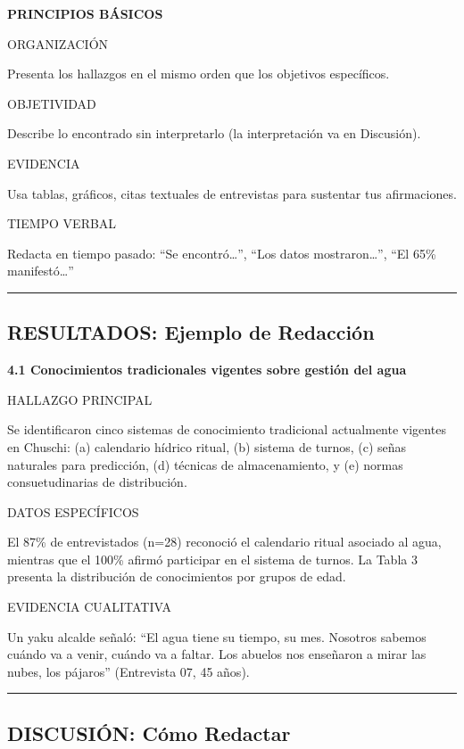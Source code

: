 \documentclass[
  11pt,
]{beaner}
\begin{document}
\textbf{PRINCIPIOS BÁSICOS}

{ORGANIZACIÓN}

Presenta los hallazgos en el mismo orden que los objetivos específicos.

{OBJETIVIDAD}

Describe lo encontrado sin interpretarlo (la interpretación va en
Discusión).

{EVIDENCIA}

Usa tablas, gráficos, citas textuales de entrevistas para sustentar tus
afirmaciones.

{TIEMPO VERBAL}

Redacta en tiempo pasado: ``Se encontró\ldots{}'', ``Los datos
mostraron\ldots{}'', ``El 65\% manifestó\ldots{}''

\begin{center}\rule{0.5\linewidth}{0.5pt}\end{center}

\subsection{RESULTADOS: Ejemplo de
Redacción}\label{resultados-ejemplo-de-redacciuxf3n}

\textbf{4.1 Conocimientos tradicionales vigentes sobre gestión del agua}

{HALLAZGO PRINCIPAL}

Se identificaron cinco sistemas de conocimiento tradicional actualmente
vigentes en Chuschi: (a) calendario hídrico ritual, (b) sistema de
turnos, (c) señas naturales para predicción, (d) técnicas de
almacenamiento, y (e) normas consuetudinarias de distribución.

{DATOS ESPECÍFICOS}

El 87\% de entrevistados (n=28) reconoció el calendario ritual asociado
al agua, mientras que el 100\% afirmó participar en el sistema de
turnos. La Tabla 3 presenta la distribución de conocimientos por grupos
de edad.

{EVIDENCIA CUALITATIVA}

Un yaku alcalde señaló: ``El agua tiene su tiempo, su mes. Nosotros
sabemos cuándo va a venir, cuándo va a faltar. Los abuelos nos enseñaron
a mirar las nubes, los pájaros'' (Entrevista 07, 45 años).

\begin{center}\rule{0.5\linewidth}{0.5pt}\end{center}

\subsection{DISCUSIÓN: Cómo
Redactar}\label{discusiuxf3n-cuxf3mo-redactar}
\end{document}

